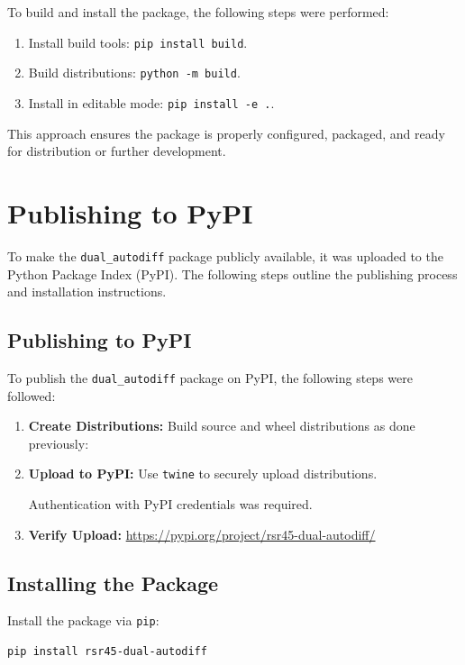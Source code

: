 \documentclass[a4paper,12pt]{article}
\begin{document}
To build and install the package, the following steps were performed:
\begin{enumerate}
    \item Install build tools: \texttt{pip install build}.
    \item Build distributions: \texttt{python -m build}.
    \item Install in editable mode: \texttt{pip install -e .}.
\end{enumerate}

This approach ensures the package is properly configured, packaged, and ready for distribution or further development.

\section{Publishing to PyPI}

To make the \texttt{dual\_autodiff} package publicly available, it was uploaded to the Python Package Index (PyPI). The following steps outline the publishing process and installation instructions.

\subsection{Publishing to PyPI}

To publish the \texttt{dual\_autodiff} package on PyPI, the following steps were followed:

\begin{enumerate}
    \item \textbf{Create Distributions:}
    Build source and wheel distributions as done previously:

    \item \textbf{Upload to PyPI:}
    Use \texttt{twine} to securely upload distributions.
    
    Authentication with PyPI credentials was required.

    \item \textbf{Verify Upload:}
    \url{https://pypi.org/project/rsr45-dual-autodiff/}
\end{enumerate}

\subsection{Installing the Package}
Install the package via \texttt{pip}:
\begin{verbatim}
pip install rsr45-dual-autodiff
\end{verbatim}
\end{document}

